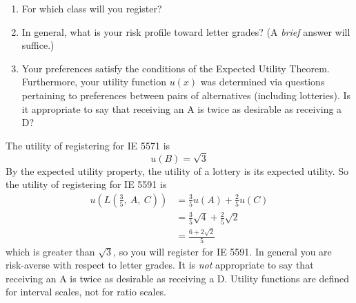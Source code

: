 \begin{enumerate}
\begin{enumerate}
\item For which class will you register?
\item In general, what is your risk profile toward letter grades?
  (A \emph{brief} answer will suffice.)
\item Your preferences satisfy the conditions of the Expected Utility
  Theorem.  Furthermore, your utility function $u(x)$ was determined
  via questions pertaining to preferences between pairs of
  alternatives (including lotteries). Is it appropriate to say that
  receiving an A is twice as desirable as receiving a D?
\end{enumerate}

\begin{solution}
\bs
The utility of registering for IE 5571 is
\[ u(B) = \sqrt{3} \]
By the expected utility property, the utility of a lottery is its
expected utility. So the utility of registering for IE 5591 is
\begin{align*}
  u\left(L\left(\frac{3}{5},~A,~C\right)\right) &= \frac{3}{5}u(A) + \frac{2}{5}u(C) \\
                  &= \frac{3}{5}\sqrt{4} + \frac{2}{5}\sqrt{2} \\
                  &= \frac{6 + 2\sqrt{2}}{5}
\end{align*}
which is greater than $\sqrt{3}$, so you will register for IE 5591.
In general you are risk-averse with respect to letter grades. It
is \emph{not} appropriate to say that receiving an A is twice
as desirable as receiving a D. Utility functions are defined for
interval scales, not for ratio scales.

\end{solution}


\end{enumerate}

